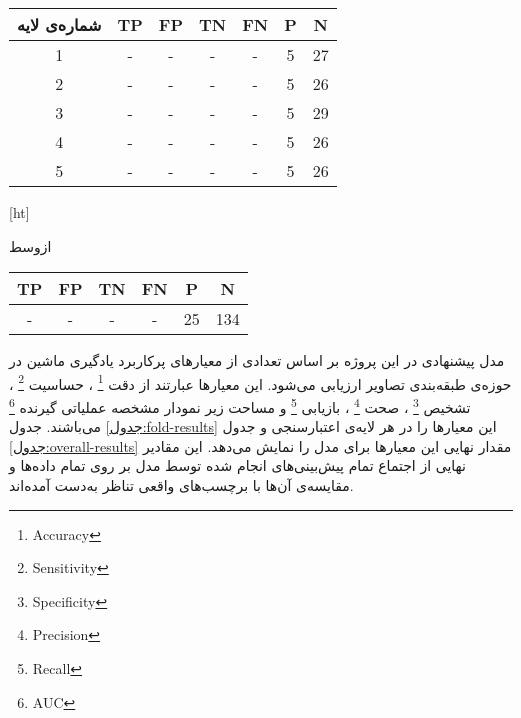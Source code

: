 \begin{tabular}{|c|c|c|c|c|c|c|}
    \hline
    \rowcolor[HTML]{EFEFEF} 
    \cellcolor[HTML]{EFEFEF}شماره‌ی لایه & \cellcolor[HTML]{EFEFEF}TP & FP & TN & FN & P & N  \\ \hline
    1                                    & -                          & -  & -  & -  & 5 & 27 \\ \hline
    2                                    & -                          & -  & -  & -  & 5 & 26 \\ \hline
    3                                    & -                          & -  & -  & -  & 5 & 29 \\ \hline
    4                                    & -                          & -  & -  & -  & 5 & 26 \\ \hline
    5                                    & -                          & -  & -  & -  & 5 & 26 \\ \hline
    \end{tabular}


[ht]

\vspace{1.5em}

‌ازوسط

\begin{tabular}{|c|c|c|c|c|c|}
    \hline
    \rowcolor[HTML]{EFEFEF} 
    \cellcolor[HTML]{EFEFEF}TP & FP & TN & FN & P  & N   \\ \hline
    -                          & -  & -  & -  & 25 & 134 \\ \hline
    \end{tabular}




مدل پیشنهادی در این پروژه بر اساس تعدادی از معیار‌های پرکاربرد یادگیری ماشین  
در حوزه‌ی طبقه‌بندی تصاویر 
ارزیابی می‌شود.
این معیارها عبارتند از دقت
\footnote{Accuracy}
،
حساسیت
\footnote{Sensitivity}
،
تشخیص
\footnote{Specificity}
،
صحت
\footnote{Precision}
،
بازیابی
\footnote{Recall}
و 
مساحت زیر نمودار مشخصه عملیاتی گیرنده
\footnote{AUC}
می‌باشند.
جدول \ref{جدول:fold-results}
این معیار‌ها را در هر لایه‌ی اعتبارسنجی و جدول 
\ref{جدول:overall-results}
مقدار نهایی این معیار‌ها برای مدل را نمایش می‌دهد.
این مقادیر نهایی از اجتماع تمام پیش‌بینی‌های انجام شده توسط مدل بر روی تمام داده‌ها و مقایسه‌ی آن‌ها با برچسب‌های واقعی تناظر به‌دست آمده‌اند.

